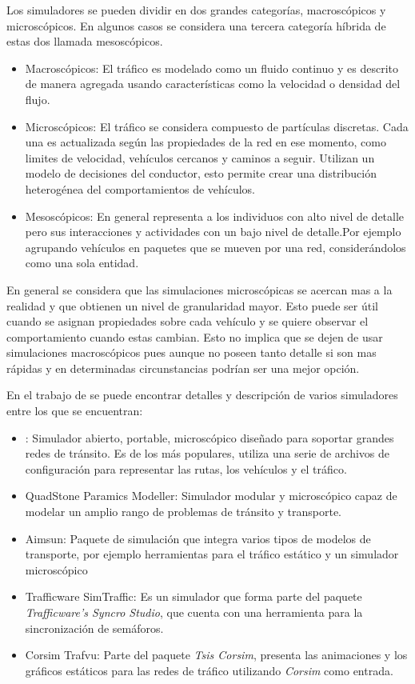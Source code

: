 Los simuladores se pueden dividir en dos grandes categorías, macroscópicos y microscópicos. En algunos casos se considera una tercera categoría híbrida de estas dos llamada mesoscópicos.

\begin{itemize}
	\item Macroscópicos: El tráfico es modelado como un fluido continuo y es descrito de manera agregada usando características como la velocidad o densidad del flujo.
	\item Microscópicos: El tráfico se considera compuesto de partículas discretas. Cada una es actualizada según las propiedades de la red en ese momento, como limites de velocidad, vehículos cercanos y caminos a seguir. Utilizan un modelo de decisiones del conductor, esto permite crear una distribución heterogénea del comportamientos de vehículos.
	\item Mesoscópicos: En general representa a los individuos con alto nivel de detalle pero sus interacciones y actividades con un bajo nivel de detalle.Por ejemplo agrupando vehículos en paquetes que se mueven por una red, considerándolos como una sola entidad.
\end{itemize}

En general se considera que las simulaciones microscópicas se acercan mas a la realidad y que obtienen un nivel de granularidad mayor. Esto puede ser útil cuando se asignan propiedades sobre cada vehículo y se quiere observar el comportamiento cuando estas cambian. Esto no implica que se dejen de usar simulaciones macroscópicos pues aunque no poseen tanto detalle si son mas rápidas y en determinadas circunstancias podrían ser una mejor opción.

En el trabajo de \citet{review_trafico} se puede encontrar detalles y descripción de varios simuladores entre los que se encuentran:
\begin{itemize}
	\item \citet{SUMO}: Simulador abierto, portable, microscópico diseñado para soportar grandes redes de tránsito. Es de los más populares, utiliza una serie de archivos de configuración para representar las rutas, los vehículos y el tráfico.
	\item QuadStone Paramics Modeller: Simulador modular y microscópico capaz de modelar un amplio rango de problemas de tránsito y transporte.
	\item Aimsun: Paquete de simulación que integra varios tipos de modelos de transporte, por ejemplo herramientas para el tráfico estático y un simulador microscópico
	\item Trafficware SimTraffic: Es un simulador que forma parte del paquete \emph{Trafficware's Syncro Studio}, que cuenta con una herramienta para la sincronización de semáforos.
	\item Corsim Trafvu: Parte del paquete \emph{Tsis Corsim}, presenta las animaciones y los gráficos estáticos para las redes de tráfico utilizando \emph{Corsim} como entrada.
\end{itemize}


